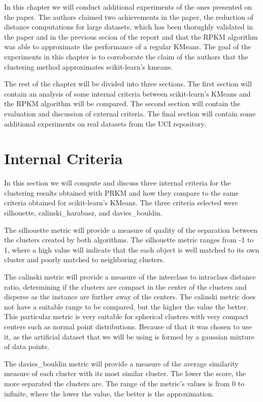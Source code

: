 In this chapter we will conduct additional experiments of the ones presented on the paper. The authors claimed two achievements in the paper, the reduction of distance computations for large datasets, which has been thorughly validated in the paper and in the previous secion of the report and that the RPKM algorithm was able to approximate the performance of a regular KMeans. The goal of the experiments in this chapter is to corroborate the claim of the authors that the clustering method approximates scikit-learn's kmeans. 

The rest of the chapter will be divided into three sections. The first section will contain an analysis of some internal criteria between scikit-learn's KMeans and the RPKM algorithm will be compared. The second section will contain the evaluation and discussion of external criteria. The final section will contain some additional experiments on real datasets from the UCI repository.

\section{Internal Criteria}
\label{section:internal}

In this section we will compute and discuss three internal criteria for the clustering results obtained with PRKM and how they compare to the same criteria obtained for scikit-learn's KMeans. The three criteria selected were silhouette, calinski\_harabasz, and davies\_bouldin. 

The silhouette metric will provide a measure of quality of the separation between the clusters created by both algorithms. The silhouette metric ranges from -1 to 1, where a high value will indicate that the each object is well matched to its own cluster and poorly matched to neighboring clusters.

The calinski metric will provide a measure of the interclass to intraclass distance ratio, determining if the clusters are compact in the center of the clusters and disperse as the instance are further away of the centers. The calinski metric does not have a suitable range to be compared, but the higher the value the better. This particular metric is very suitable for spherical clusters with very compact centers such as normal point distributions. Because of that it was chosen to use it, as the artificial dataset that we will be using is formed by a gaussian mixture of data points.

The davies\_bouldin metric will provide a measure of the average similarity measure of each cluster with its most similar cluster. The lower the score, the more separated the clusters are. The range of the metric's values is from 0 to infinite, where the lower the value, the better is the approximation.

